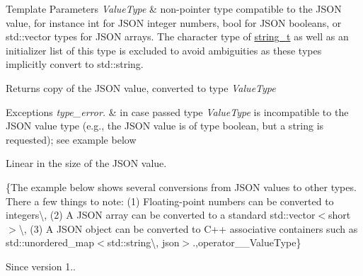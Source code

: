 \begin{DoxyTemplParams}{Template Parameters}
{\em Value\+Type} & non-\/pointer type compatible to the J\+S\+ON value, for instance {\ttfamily int} for J\+S\+ON integer numbers, {\ttfamily bool} for J\+S\+ON booleans, or {\ttfamily std\+::vector} types for J\+S\+ON arrays. The character type of \hyperlink{classnlohmann_1_1basic__json_a33593865ffb1860323dcbd52425b90c8}{string\+\_\+t} as well as an initializer list of this type is excluded to avoid ambiguities as these types implicitly convert to {\ttfamily std\+::string}.\\
\hline
\end{DoxyTemplParams}
\begin{DoxyReturn}{Returns}
copy of the J\+S\+ON value, converted to type {\itshape Value\+Type} 
\end{DoxyReturn}

\begin{DoxyExceptions}{Exceptions}
{\em type\+\_\+error.} & in case passed type {\itshape Value\+Type} is incompatible to the J\+S\+ON value type (e.\+g., the J\+S\+ON value is of type boolean, but a string is requested); see example below\\
\hline
\end{DoxyExceptions}
Linear in the size of the J\+S\+ON value.

\{The example below shows several conversions from J\+S\+ON values to other types. There a few things to note\+: (1) Floating-\/point numbers can be converted to integers\textbackslash{}, (2) A J\+S\+ON array can be converted to a standard {\ttfamily std\+::vector$<$short$>$}\textbackslash{}, (3) A J\+S\+ON object can be converted to C++ associative containers such as {\ttfamily std\+::unordered\+\_\+map$<$std\+::string\textbackslash{}, json$>$}.,operator\+\_\+\+\_\+\+Value\+Type\}

\begin{DoxySince}{Since}
version 1.. 
\end{DoxySince}
\mbox{\label{classnlohmann_1_1basic__json_a40226d9c84fcb9cb948ae0c27b842c57}} 
